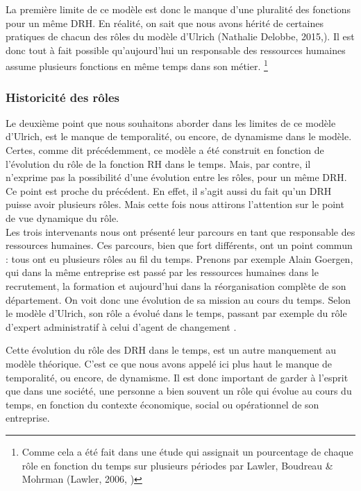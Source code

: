 La première limite de ce modèle est donc le manque d'une pluralité des fonctions pour un même DRH. En réalité, on sait que nous avons hérité de certaines pratiques de chacun des rôles du modèle d'Ulrich (Nathalie Delobbe, 2015,\cite{slidegrh}). Il est donc tout à fait possible qu'aujourd'hui un responsable des ressources humaines assume plusieurs fonctions en même temps dans son métier.
\footnote{Comme cela a été fait dans une étude qui assignait un pourcentage de chaque rôle en fonction du temps sur plusieurs périodes par Lawler, Boudreau \& Mohrman (Lawler, 2006, \cite{Lawler2006})}\\



\subsubsection*{Historicité des rôles}

Le deuxième point que nous souhaitons aborder dans les limites de ce modèle d'Ulrich, est le manque de temporalité, ou encore, de dynamisme dans le modèle. Certes, comme dit précédemment, ce modèle a été construit en fonction de l'évolution du rôle de la fonction RH dans le temps. Mais, par contre, il n'exprime pas la possibilité d'une évolution entre les rôles, pour un même DRH. Ce point est proche du précédent. En effet, il s'agit aussi du fait qu'un DRH puisse avoir plusieurs rôles. Mais cette fois nous attirons l'attention sur le point de vue dynamique du rôle. \\

Les trois intervenants nous ont présenté leur parcours en tant que responsable des ressources humaines. Ces parcours, bien que fort différents, ont un point commun : tous ont eu plusieurs rôles au fil du temps. Prenons par exemple Alain Goergen, qui dans la même entreprise est passé par les ressources humaines dans le recrutement, la formation et aujourd'hui dans la réorganisation complète de son département. On voit donc une évolution de sa mission au cours du temps. Selon le modèle d'Ulrich, son rôle a évolué dans le temps, passant par exemple du rôle d'\og{}expert administratif\fg{} à celui d'\og{}agent de changement \fg{}. \newline 

Cette évolution du rôle des DRH dans le temps, est un autre manquement au modèle théorique. C'est ce que nous avons appelé ici plus haut le manque de temporalité, ou encore, de dynamisme. Il est donc important de garder à l'esprit que dans une société, une personne a bien souvent un rôle qui évolue au cours du temps, en fonction du contexte économique, social ou opérationnel de son entreprise. \\ 


